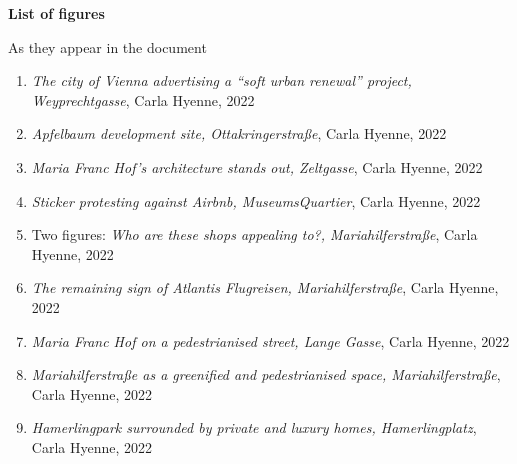 \documentclass{article}
\begin{document}
\pagebreak

\large\textbf{{List of figures}}

As they appear in the document

\begin{enumerate}
	\item \textit{The city of Vienna advertising a ``soft urban renewal'' project, Weyprechtgasse}, Carla Hyenne, 2022
	\item \textit{Apfelbaum development site, Ottakringerstraße}, Carla Hyenne, 2022
	\item \textit{Maria Franc Hof's architecture stands out, Zeltgasse}, Carla Hyenne, 2022
	\item \textit{Sticker protesting against Airbnb, MuseumsQuartier}, Carla Hyenne, 2022
	\item Two figures: \textit{Who are these shops appealing to?, Mariahilferstraße}, Carla Hyenne, 2022
	\item \textit{The remaining sign of Atlantis Flugreisen, Mariahilferstraße}, Carla Hyenne, 2022
	\item \textit{Maria Franc Hof on a pedestrianised street, Lange Gasse}, Carla Hyenne, 2022
	\item \textit{Mariahilferstraße as a greenified and pedestrianised space, Mariahilferstraße}, Carla Hyenne, 2022
	\item \textit{Hamerlingpark surrounded by private and luxury homes, Hamerlingplatz}, Carla Hyenne, 2022
\end{enumerate}
\end{document}
